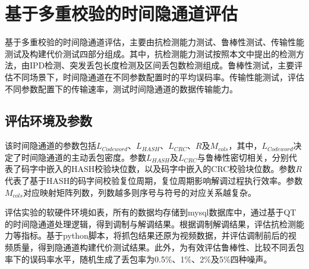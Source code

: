 \section{基于多重校验的时间隐通道评估}
\label{chap:hash:result}

基于多重校验的时间隐通道评估，主要由抗检测能力测试、鲁棒性测试、传输性能测试及构建代价测试四部分组成。其中，抗检测能力测试按照本文中提出的检测方法，由IPD检测、突发丢包长度检测及区间丢包数检测组成。鲁棒性测试，主要评估不同场景下，时间隐通道在不同参数配置时的平均误码率。传输性能测试，评估不同参数配置下的传输速率，测试时间隐通道的数据传输能力。

\subsection{评估环境及参数}
\label{chap:hash:result:parameters}

该时间隐通道的参数包括$L_{Codeword}$、$L_{HASH}$、$L_{CRC}$、$R$及$M_{cols}$，其中，$L_{Codeword}$决定了时间隐通道的主动丢包密度。参数$L_{HASH}$及$L_{CRC}$与鲁棒性密切相关，分别代表了码字中嵌入的HASH校验块位数，以及码字中嵌入的CRC校验块位数。参数$R$代表了基于HASH的码字间校验复位周期，复位周期影响解调过程执行效率。参数$M_{cols}$对应映射矩阵列数，列数越多则序号与符号的对应关系越复杂。


评估实验的软硬件环境如表，所有的数据均存储到mysql数据库中，通过基于QT的时间隐通道处理逻辑，得到调制与解调结果。根据调制解调结果，评估抗检测能力等指标。基于python脚本，将抓包结果还原为视频数据，并评估调制前后的视频质量，得到隐通道构建代价测试结果。此外，为有效评估鲁棒性、比较不同丢包率下的误码率水平，随机生成了丢包率为0.5\%、1\%、2\%及5\%四种噪声。

